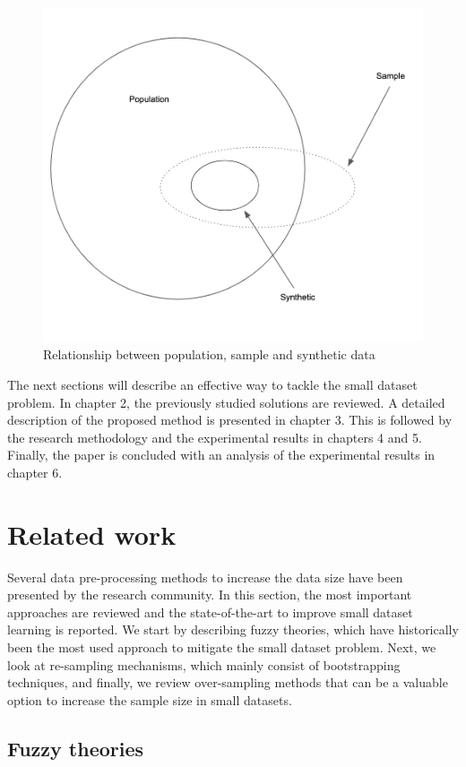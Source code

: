\documentclass[parskip=full]{scrartcl}
\begin{document}
\begin{figure}[H]
	\centering
	\includegraphics[width=0.75\linewidth]{../analysis/relationship.png}
	\caption{Relationship between population, sample and synthetic data \cite{Li.2006}}
	\label{fig:relationship}
\end{figure}

The next sections will describe an effective way to tackle the small dataset
problem. In chapter 2, the previously studied solutions are reviewed. A detailed
description of the proposed method is presented in chapter 3. This is followed
by the research methodology and the experimental results in chapters 4 and 5.
Finally, the paper is concluded with an analysis of the experimental results in
chapter 6.

\section{Related work}

Several data pre-processing methods to increase the data size have been
presented by the research community. In this section, the most important
approaches are reviewed and the state-of-the-art to improve small dataset
learning is reported. We start by describing fuzzy theories, which have
historically been the most used approach to mitigate the small dataset problem.
Next, we look at re-sampling mechanisms, which mainly consist of bootstrapping
techniques, and finally, we review over-sampling methods that can be a valuable
option to increase the sample size in small datasets.

\subsection{Fuzzy theories}
\end{document}
